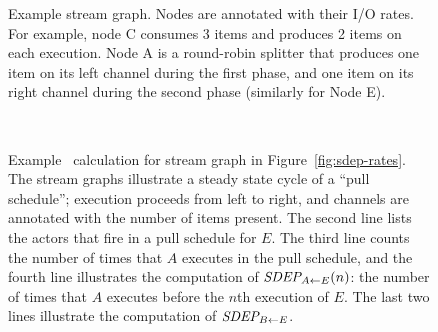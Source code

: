 \begin{figure}[t!]
\begin{center}
\vspace{-12pt}
\vspace{-6pt}
\caption[Example stream graph for calculation of stream dependence
  function]{Example stream graph.  Nodes are annotated with their I/O
  rates.  For example, node C consumes 3 items and produces 2 items on
  each execution.  Node A is a round-robin splitter that produces one
  item on its left channel during the first phase, and one item on its
  right channel during the second phase (similarly for Node E).
  \protect\label{fig:sdep-rates}}

~ \\ \vspace{6pt}
\vspace{-4pt}
\caption[Example calculation of stream dependence function]{Example \figsdep\ calculation
  for stream graph in Figure~\ref{fig:sdep-rates}.  The stream graphs
  illustrate a steady state cycle of a ``pull schedule''; execution
  proceeds from left to right, and channels are annotated with the
  number of items present.  The second line lists the actors that fire
  in a pull schedule for $E$.  The third line counts the number of
  times that $A$ executes in the pull schedule, and the fourth line
  illustrates the computation of $\mbox{\it SDEP}_{A \small{\leftarrow} E}(n)$: the number of
  times that $A$ executes before the $n$th execution of $E$.  The last
  two lines illustrate the computation of $\mbox{\it SDEP}_{B \small{\leftarrow} E}$.
  \protect\label{fig:sdep1}}
\end{center}
\vspace{-26pt}
\end{figure}

